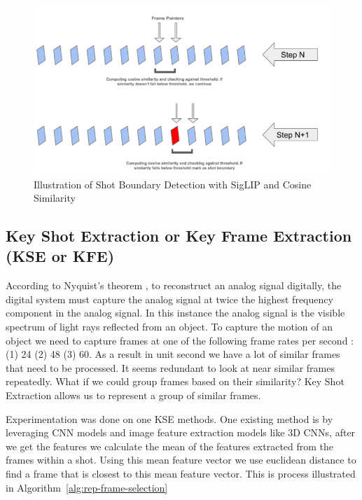 \documentclass[12pt]{report}
\begin{document}
	
	\begin{figure}[h]  %
		\centering
		\includegraphics[width=\linewidth]{sbd_illustration.png}  %
		\caption{Illustration of Shot Boundary Detection with SigLIP and Cosine Similarity}
		\label{fig:sbd_illustration}
	\end{figure}
	
	
	\subsection{Key Shot Extraction or Key Frame Extraction (KSE or KFE)}
	
	According to Nyquist’s theorem \cite{adc}, to reconstruct an analog signal digitally, the digital system must capture the analog signal at twice the highest frequency component in the analog signal. In this instance the analog signal is the visible spectrum of light rays reflected from an object. \cite{fps} To capture the motion of an object we need to capture frames at one of the following frame rates per second : (1) 24 (2) 48 (3) 60. As a result in unit second we have a lot of similar frames that need to be processed. It seems redundant to look at near similar frames repeatedly. What if we could group frames based on their similarity? Key Shot Extraction allows us to represent a group of similar frames.
	

		
	
	Experimentation was done on one KSE methods. \cite{telnet} One existing method is by leveraging CNN models and image feature extraction models  like 3D CNNs, after we get the features we calculate the mean of the features extracted from the frames within a shot. Using this mean feature vector we use euclidean distance to find a frame that is closest to this mean feature vector. This is process illustrated in Algorithm~\ref{alg:rep-frame-selection}
	
\end{document}
